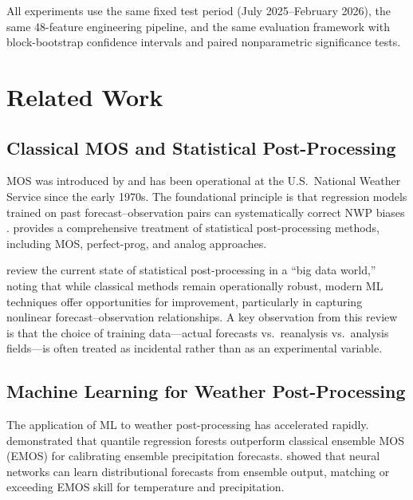 \documentclass{ametsocV6.1}
\begin{document}
All experiments use the same fixed test period (July 2025--February 2026), the same
48-feature engineering pipeline, and the same evaluation framework with
block-bootstrap confidence intervals and paired nonparametric significance tests.

\section{Related Work}
\label{sec:related}

\subsection{Classical MOS and Statistical Post-Processing}

MOS was introduced by \citet{glahn1972mos} and has been operational at the U.S.\
National Weather Service since the early 1970s. The foundational principle is that
regression models trained on past forecast--observation pairs can systematically
correct NWP biases \citep{carter1989mos}. \citet{wilks2011statistical} provides a
comprehensive treatment of statistical post-processing methods, including MOS,
perfect-prog, and analog approaches.

\citet{vannitsem2021statistical} review the current state of statistical
post-processing in a ``big data world,'' noting that while classical methods remain
operationally robust, modern ML techniques offer opportunities for improvement,
particularly in capturing nonlinear forecast--observation relationships. A key
observation from this review is that the choice of training data---actual forecasts
vs.\ reanalysis vs.\ analysis fields---is often treated as incidental rather than
as an experimental variable.

\subsection{Machine Learning for Weather Post-Processing}

The application of ML to weather post-processing has accelerated rapidly.
\citet{taillardat2016calibrated} demonstrated that quantile regression forests
outperform classical ensemble MOS (EMOS) for calibrating ensemble precipitation
forecasts. \citet{rasp2018neural} showed that neural networks can learn
distributional forecasts from ensemble output, matching or exceeding EMOS skill
for temperature and precipitation.
\end{document}
